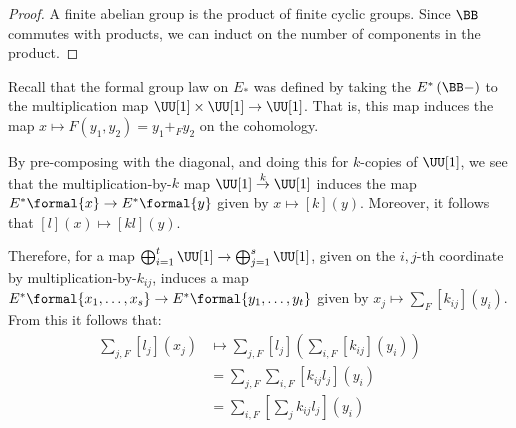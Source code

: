 \begin{proof}
	A finite abelian group is the product of finite cyclic groups.
	Since $\BB$ commutes with products, we can induct on the number of components in the product.
\end{proof}

Recall that the formal group law on $E_*$ was defined by taking the $E^*\left(\BB-\right)$ to the multiplication map $\UU[1] \times \UU[1] \to \UU[1]$.
That is, this map induces the map $x \mapsto F\left(y_1, y_2\right) = y_1 +_F y_2$ on the cohomology.

By pre-composing with the diagonal, and doing this for $k$-copies of $\UU[1]$, we see that the multiplication-by-$k$ map $\UU[1] \overset{k}{\to} \UU[1]$ induces the map $E^*\formal{x} \to E^*\formal{y}$ given by $x \mapsto \left[k\right]\left(y\right)$.
Moreover, it follows that $\left[l\right]\left(x\right) \mapsto \left[kl\right]\left(y\right)$.

Therefore, for a map $\bigoplus_{i=1}^t \UU[1] \to \bigoplus_{j=1}^s \UU[1]$, given on the $i,j$-th coordinate by multiplication-by-$k_{ij}$, induces a map
$E^*\formal{x_1, \dotsc, x_s} \to E^*\formal{y_1, \dotsc, y_t}$
given by $x_j \mapsto \sum_F\left[k_{ij}\right]\left(y_i\right)$.
From this it follows that:
\begin{align*}
	\sum_{j,F}\left[l_j\right]\left(x_j\right)
	&\mapsto \sum_{j,F}\left[l_j\right]\left(\sum_{i,F}\left[k_{ij}\right]\left(y_i\right)\right)\\
	&= \sum_{j,F}\sum_{i,F}\left[k_{ij} l_j\right]\left(y_i\right)\\
	&= \sum_{i,F}\left[\sum_j k_{ij} l_j\right]\left(y_i\right)
\end{align*}

